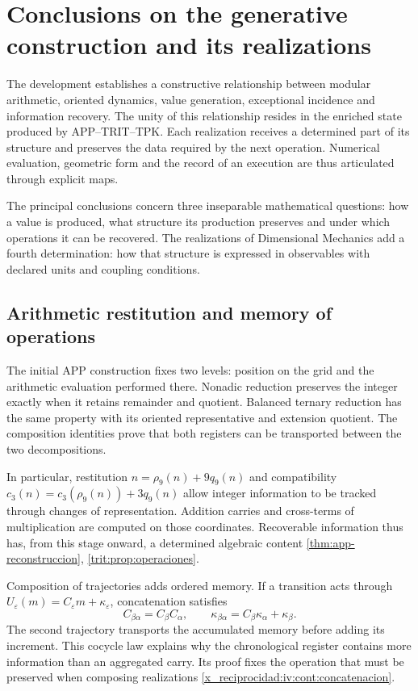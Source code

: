 \chapter{Conclusions on the generative construction and its realizations}
\label{hmt:sistematica:conclusiones}

The development establishes a constructive relationship between modular arithmetic, oriented dynamics, value generation, exceptional incidence and information recovery. The unity of this relationship resides in the enriched state produced by APP--TRIT--TPK. Each realization receives a determined part of its structure and preserves the data required by the next operation. Numerical evaluation, geometric form and the record of an execution are thus articulated through explicit maps.

The principal conclusions concern three inseparable mathematical questions: how a value is produced, what structure its production preserves and under which operations it can be recovered. The realizations of Dimensional Mechanics add a fourth determination: how that structure is expressed in observables with declared units and coupling conditions.

\section{Arithmetic restitution and memory of operations}

The initial APP construction fixes two levels: position on the grid and the arithmetic evaluation performed there. Nonadic reduction preserves the integer exactly when it retains remainder and quotient. Balanced ternary reduction has the same property with its oriented representative and extension quotient. The composition identities prove that both registers can be transported between the two decompositions.

In particular, restitution \(n=\rho_9(n)+9q_9(n)\) and compatibility \(c_3(n)=c_3(\rho_9(n))+3q_9(n)\) allow integer information to be tracked through changes of representation. Addition carries and cross-terms of multiplication are computed on those coordinates. Recoverable information thus has, from this stage onward, a determined algebraic content \ref{thm:app-reconstruccion}, \ref{trit:prop:operaciones}.

Composition of trajectories adds ordered memory. If a transition acts through \(U_\varepsilon(m)=C_\varepsilon m+
\kappa_\varepsilon\), concatenation satisfies
\[
 C_{\beta\alpha}=C_\beta C_\alpha,
 \qquad
 \kappa_{\beta\alpha}=C_\beta\kappa_\alpha+
 \kappa_\beta.
\]
The second trajectory transports the accumulated memory before adding its increment. This cocycle law explains why the chronological register contains more information than an aggregated carry. Its proof fixes the operation that must be preserved when composing realizations \ref{x_reciprocidad:iv:cont:concatenacion}.

